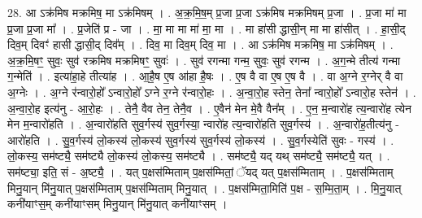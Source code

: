 \documentclass[17pt]{extarticle}
\begin{document}
28. आ ऽक्र॑मिष मक्रमिष॒ मा ऽक्र॑मिषम् । . अ॒क्र॒मि॒ष॒म् प्र॒जा प्र॒जा ऽक्र॑मिष मक्रमिषम् प्र॒जा । . प्र॒जा मा॑ मा प्र॒जा प्र॒जा मा᳚ । . प्र॒जेति॑ प्र - जा । . मा॒ मा मा मा॑ मा॒ मा । . मा हा॑सी द्धासी॒न् मा मा हा॑सीत् । . हा॒सी॒द् दिव॒म् दिवꣳ॑ हासी द्धासी॒द् दिव᳚म् । . दिव॒ मा दिव॒म् दिव॒ मा । . आ ऽक्र॑मिष मक्रमिष॒ मा ऽक्र॑मिषम् । . अ॒क्र॒मि॒षꣳ॒॒ सुवः॒ सुव॑ रक्रमिष मक्रमिषꣳ॒॒ सुवः॑ । . सुव॑ रगन्मा गन्म॒ सुवः॒ सुव॑ रगन्म । . अ॒ग॒न्मे तीत्य॑ गन्मा ग॒न्मेति॑ । . इत्या॑हा॒हे तीत्या॑ह । . आ॒है॒ष ए॒ष आ॑हा है॒षः । . ए॒ष वै वा ए॒ष ए॒ष वै । . वा अ॒ग्ने र॒ग्नेर् वै वा अ॒ग्नेः । . अ॒ग्ने र॑न्वारो॒हो᳚ ऽन्वारो॒हो᳚ ऽग्ने र॒ग्ने र॑न्वारो॒हः । . अ॒न्वा॒रो॒ह स्तेन॒ तेना᳚ न्वारो॒हो᳚ ऽन्वारो॒ह स्तेन॑ । . अ॒न्वा॒रो॒ह इत्य॑नु - आ॒रो॒हः । . तेनै॒ वैव तेन॒ तेनै॒व । . ए॒वैन॑ मेन मे॒वै वैन᳚म् । . ए॒न॒ म॒न्वारो॑ह त्य॒न्वारो॑ह त्येन मेन म॒न्वारो॑हति । . अ॒न्वारो॑हति सुव॒र्गस्य॑ सुव॒र्गस्या॒ न्वारो॑ह त्य॒न्वारो॑हति सुव॒र्गस्य॑ । . अ॒न्वारो॑ह॒तीत्य॑नु - आरो॑हति । . सु॒व॒र्गस्य॑ लो॒कस्य॑ लो॒कस्य॑ सुव॒र्गस्य॑ सुव॒र्गस्य॑ लो॒कस्य॑ । . सु॒व॒र्गस्येति॑ सुवः - गस्य॑ । . लो॒कस्य॒ सम॑ष्ट्यै॒ सम॑ष्ट्यै लो॒कस्य॑ लो॒कस्य॒ सम॑ष्ट्यै । . सम॑ष्ट्यै॒ यद् यथ् सम॑ष्ट्यै॒ सम॑ष्ट्यै॒ यत् । . सम॑ष्ट्या॒ इति॒ सं - अ॒ष्ट्यै॒ । . यत् प॒क्षस॑म्मिताम् प॒क्षस॑म्मितां॒ ॅयद् यत् प॒क्षस॑म्मिताम् । . प॒क्षस॑म्मिताम् मिनु॒यान् मि॑नु॒यात् प॒क्षस॑म्मिताम् प॒क्षस॑म्मिताम् मिनु॒यात् । . प॒क्षस॑म्मिता॒मिति॑ प॒क्ष - स॒म्मि॒ता॒म् । . मि॒नु॒यात् कनी॑याꣳस॒म् कनी॑याꣳसम् मिनु॒यान् मि॑नु॒यात् कनी॑याꣳसम् । \newline
\end{document}
